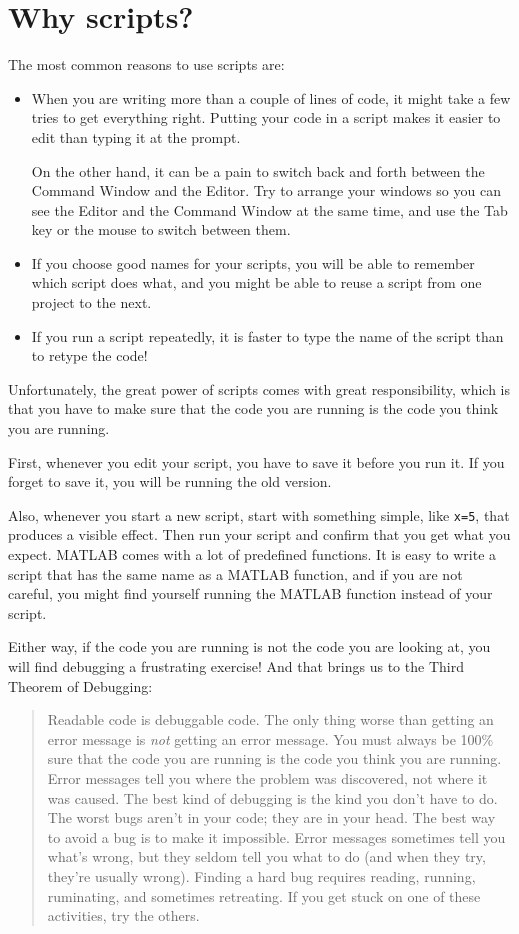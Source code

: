 \documentclass{book}
\newcommand{\displaythrm}[1]{%
    \ifthenelse{\equal{#1}{1}}%
        {Readable code is debuggable code.}{%
    \ifthenelse{\equal{#1}{2}}%
        {The only thing worse than getting an error message is {\em
         not} getting an error message.}{%
    \ifthenelse{\equal{#1}{3}}%
        {You must always be 100\% sure that the code you are running
         is the code you think you are running.}{%
    \ifthenelse{\equal{#1}{4}}%
        {Error messages tell you where the problem was discovered,
         not where it was caused.}{%
    \ifthenelse{\equal{#1}{5}}%
        {The best kind of debugging is the kind you don't have to do.}{%
    \ifthenelse{\equal{#1}{6}}%
        {The worst bugs aren't in your code; they are in your head.}{%
    \ifthenelse{\equal{#1}{7}}%
        {The best way to avoid a bug is to make it impossible.}{%
    \ifthenelse{\equal{#1}{8}}%
        {Error messages sometimes tell you what's wrong, but they
         seldom tell you what to do (and when they try, they're usually
         wrong).}{%
    \ifthenelse{\equal{#1}{9}}%
        {Finding a hard bug requires reading, running, ruminating,
         and sometimes retreating.  If you get stuck on one of these
         activities, try the others.}{%
    {}%
}}}}}}}}}}%
\begin{document}
\section{Why scripts?}

The most common reasons to use scripts are:

\begin{itemize}

\item When you are writing more than a couple of lines of code, it
might take a few tries to get everything right.  Putting your code
in a script makes it easier to edit than typing it at the prompt.

On the other hand, it can be a pain to switch back and forth between
the Command Window and the Editor.  Try to arrange your windows so
you can see the Editor and the Command Window at the same time, and
use the Tab key or the mouse to switch between them.

\item If you choose good names for your scripts, you will be able
to remember which script does what, and you might be able to reuse
a script from one project to the next.

\item If you run a script repeatedly, it is faster to type the
name of the script than to retype the code!

\end{itemize}

Unfortunately, the great power of scripts comes with great responsibility,
which is that you have to make sure that the code you are running is
the code you think you are running.

First, whenever you edit your script, you have to save it before you
run it.  If you forget to save it, you will be running the old version.

Also, whenever you start a new script, start with something simple,
like {\tt x=5}, that produces a visible effect.  Then run your script
and confirm that you get what you expect.  MATLAB comes with a lot of
predefined functions.  It is easy to write a script that has the same
name as a MATLAB function, and if you are not careful, you might
find yourself running the MATLAB function instead of your script.

Either way, if the code you are running is not the code you are looking
at, you will find debugging a frustrating exercise!  And that brings
us to the Third Theorem of Debugging:

\begin{quote}
\displaythrm{3}
\end{quote}
\end{document}
